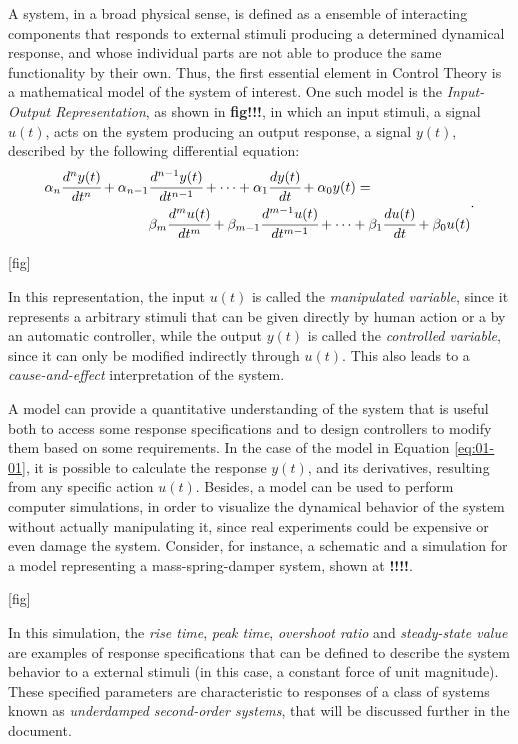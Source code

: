 \documentclass[a4paper,11pt]{book}
\numberwithin{figure}{chapter}
\numberwithin{equation}{chapter}
\numberwithin{table}{chapter}
\theoremstyle{definition}
\begin{document}
A system, in a broad physical sense, is defined as a ensemble of interacting components that responds to external stimuli producing a determined dynamical response, and whose individual parts are not able to produce the same functionality by their own. Thus, the first essential element in Control Theory is a mathematical model of the system of interest. One such model is the \textit{Input-Output Representation}, as shown in \textbf{fig!!!}, in which an input stimuli, a signal $u(t)$, acts on the system producing an output response, a signal $y(t)$, described by the following differential equation:
\begin{equation} \label{eq:01-01}
\begin{split}
    \alpha_n \cfrac{d^n y(t)}{dt^n} + \alpha_{n-1} & \cfrac{d^{n-1} y(t)}{dt^{n-1}} + \cdots + \alpha_{1} \cfrac{d y(t)}{dt} + \alpha_{0} y(t) = \\
    & \beta_m \cfrac{d^m u(t)}{dt^m} + \beta_{m-1} \cfrac{d^{m-1} u(t)}{dt^{m-1}} + \cdots + \beta_{1} \cfrac{d u(t)}{dt} + \beta_{0} u(t)
\end{split}
.\end{equation}

[fig]

In this representation, the input $u(t)$ is called the \textit{manipulated variable}, since it represents a arbitrary stimuli that can be given directly by human action or a by an automatic controller, while the output $y(t)$ is called the \textit{controlled variable}, since it can only be modified indirectly through $u(t)$. This also leads to a \textit{cause-and-effect} interpretation of the system.

A model can provide a quantitative understanding of the system that is useful both to access some response specifications and to design controllers to modify them based on some requirements. In the case of the model in Equation \eqref{eq:01-01}, it is possible to calculate the response $y(t)$, and its derivatives, resulting from any specific action $u(t)$. Besides, a model can be used to perform computer simulations, in order to visualize the dynamical behavior of the system without actually manipulating it, since real experiments could be expensive or even damage the system. Consider, for instance, a schematic and a simulation for a model representing a mass-spring-damper system, shown at \textbf{!!!!}.

[fig]

In this simulation, the \textit{rise time}, \textit{peak time}, \textit{overshoot ratio} and \textit{steady-state value} are examples of response specifications that can be defined to describe the system behavior to a external stimuli (in this case, a constant force of unit magnitude). These specified parameters are characteristic to responses of a class of systems known as \textit{underdamped second-order systems}, that will be discussed further in the document. 
\end{document}
